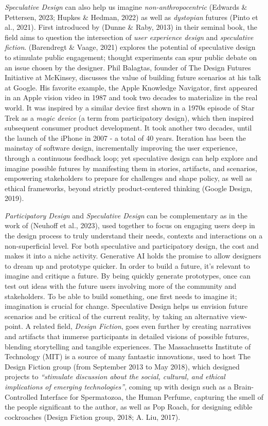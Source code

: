 \documentclass[
  12pt,
  letterpaper,
  DIV=11,
  numbers=noendperiod]{scrartcl}
\begin{document}
\emph{Speculative Design} can also help us imagine
\emph{non-anthropocentric} (Edwards \& Pettersen, 2023; Hupkes \&
Hedman, 2022) as well as \emph{dystopian} futures (Pinto et al., 2021).
First introduced by (Dunne \& Raby, 2013) in their seminal book, the
field aims to question the intersection of \emph{user experience design}
and \emph{speculative fiction}. (Barendregt \& Vaage, 2021) explores the
potential of speculative design to stimulate public engagement; thought
experiments can spur public debate on an issue chosen by the designer.
Phil Balagtas, founder of The Design Futures Initiative at McKinsey,
discusses the value of building future scenarios at his talk at Google.
His favorite example, the Apple Knowledge Navigator, first appeared in
an Apple vision video in 1987 and took two decades to materialize in the
real world. It was inspired by a similar device first shown in a 1970s
episode of Star Trek as a \emph{magic device} (a term from participatory
design), which then inspired subsequent consumer product development. It
took another two decades, until the launch of the iPhone in 2007 - a
total of 40 years. Iteration has been the mainstay of software design,
incrementally improving the user experience, through a continuous
feedback loop; yet speculative design can help explore and imagine
possible futures by manifesting them in stories, artifacts, and
scenarios, empowering stakeholders to prepare for challenges and shape
policy, as well as ethical frameworks, beyond strictly product-centered
thinking (Google Design, 2019).

\emph{Participatory Design} and \emph{Speculative Design} can be
complementary as in the work of (Neuhoff et al., 2023), used together to
focus on engaging users deep in the design process to truly understand
their needs, contexts and interactions on a non-superficial level. For
both speculative and participatory design, the cost and makes it into a
niche activity. Generative AI holds the promise to allow designers to
dream up and prototype quicker. In order to build a future, it's
relevant to imagine and critique a future. By being quickly generate
prototypes, once can test out ideas with the future users involving more
of the community and stakeholders. To be able to build something, one
first needs to imagine it; imagination is crucial for change.
Speculative Design helps us envision future scenarios and be critical of
the current reality, by taking an alternative view-point. A related
field, \emph{Design Fiction}, goes even further by creating narratives
and artifacts that immerse participants in detailed visions of possible
futures, blending storytelling and tangible experiences. The
Massachusetts Institute of Technology (MIT) is a source of many
fantastic innovations, used to host The Design Fiction group (from
September 2013 to May 2018), which designed projects to
\emph{``stimulate discussion about the social, cultural, and ethical
implications of emerging technologies''}, coming up with design such as
a Brain-Controlled Interface for Spermatozoa, the Human Perfume,
capturing the smell of the people significant to the author, as well as
Pop Roach, for designing edible cockroaches (Design Fiction group, 2018;
A. Liu, 2017).
\end{document}
